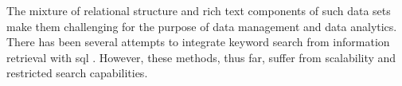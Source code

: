 		The mixture of relational structure and rich text components of such data sets make them challenging for the purpose of data management and data analytics.  There has been several attempts to integrate keyword search from information retrieval with \gls{sql} \cite{banks-02, fuzzy-11, ir-03}.  However, these methods, thus far, suffer from scalability and restricted search capabilities.